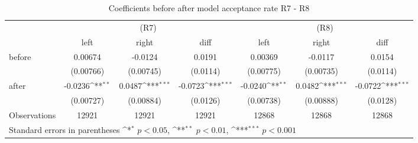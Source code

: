\begin{table}[!ht]\centering \footnotesize
\def\sym#1{\ifmmode^{#1}\else\(^{#1}\)\fi}
\caption{Coefficients before after model acceptance rate R7 - R8}
\begin{tabular}{l*{6}{c}}
\hline\hline
                    &\multicolumn{3}{c}{(R7)}&\multicolumn{3}{c}{(R8)}\\
&\multicolumn{1}{c}{left}&\multicolumn{1}{c}{right}&\multicolumn{1}{c}{diff}&\multicolumn{1}{c}{left}&\multicolumn{1}{c}{right}&\multicolumn{1}{c}{diff}\\
\hline
before              &     0.00674         &     -0.0124         &      0.0191         &     0.00369         &     -0.0117         &      0.0154         \\
                    &   (0.00766)         &   (0.00745)         &    (0.0114)         &   (0.00775)         &   (0.00735)         &    (0.0114)         \\
[0,5em]
after               &     -0.0236\sym{**} &      0.0487\sym{***}&     -0.0723\sym{***}&     -0.0240\sym{**} &      0.0482\sym{***}&     -0.0722\sym{***}\\
                    &   (0.00727)         &   (0.00884)         &    (0.0126)         &   (0.00738)         &   (0.00888)         &    (0.0128)         \\
\hline
Observations        &       12921         &       12921         &       12921         &       12868         &       12868         &       12868         \\
\hline\hline
\multicolumn{7}{l}{\footnotesize Standard errors in parentheses \sym{*} \(p<0.05\), \sym{**} \(p<0.01\), \sym{***} \(p<0.001\)}\\
\end{tabular}
\end{table}
